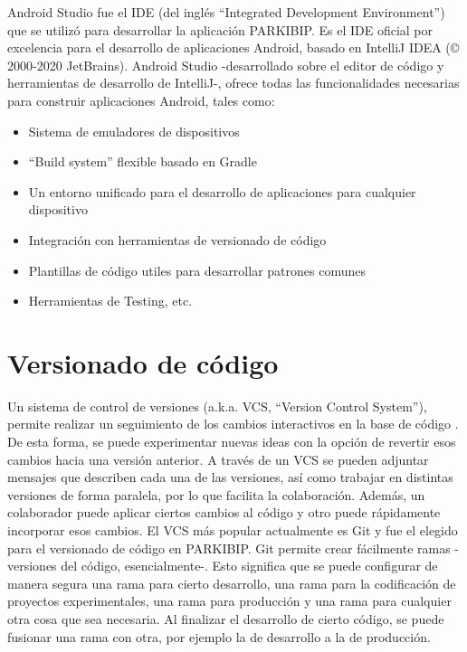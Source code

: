 
Android Studio fue el \gls{IDE} (del inglés ``Integrated Development Environment'') que se utilizó para desarrollar la aplicación PARKIBIP. Es el IDE oficial por excelencia para el desarrollo de aplicaciones Android, basado en IntelliJ IDEA (© 2000-2020 JetBrains). Android Studio -desarrollado sobre el editor de código y herramientas de desarrollo de IntelliJ-,  ofrece todas las funcionalidades necesarias para construir aplicaciones Android, tales como:

\begin{itemize}
    \item Sistema de emuladores de dispositivos 
    \item ``Build system'' flexible basado en Gradle 
    \item Un entorno unificado para el desarrollo de aplicaciones para cualquier dispositivo
    \item Integración con herramientas de versionado de código 
    \item Plantillas de código utiles para desarrollar patrones comunes 
    \item Herramientas de Testing, etc.
\end{itemize}

\section{Versionado de código}\label{project:version-control}

Un sistema de control de versiones (a.k.a. VCS, ``Version Control System''), permite realizar un seguimiento de los cambios interactivos en la base de código \cite{Blischak2016}. De esta forma, se puede experimentar nuevas ideas con la opción de revertir esos cambios hacia una versión anterior. A través de un VCS se pueden adjuntar mensajes que describen cada una de las versiones, así como trabajar en distintas versiones de forma paralela, por lo que facilita la colaboración. Además, un colaborador puede aplicar ciertos cambios al código y otro puede rápidamente incorporar esos cambios. 
El VCS más popular actualmente es Git \cite{Blischak2016} y fue el elegido para el versionado de código en PARKIBIP. Git permite crear fácilmente ramas -versiones del código, esencialmente-. Esto significa que se puede configurar de manera segura una rama para cierto desarrollo, una rama para la codificación de proyectos experimentales, una rama para producción y una rama para cualquier otra cosa que sea necesaria. Al finalizar el desarrollo de cierto código, se puede fusionar una rama con otra, por ejemplo la de desarrollo a la de producción. 

